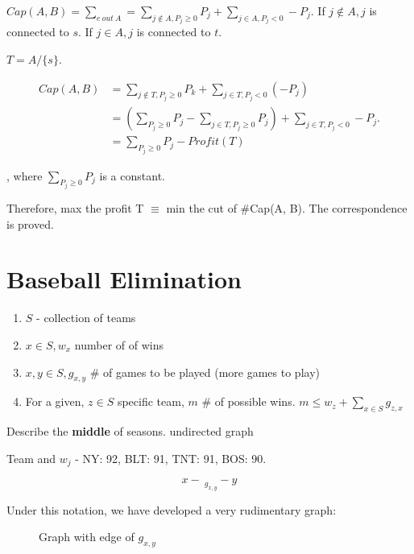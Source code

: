 \documentclass[a4paper]{report}
\theoremstyle{definition}
\begin{document}
$Cap(A, B)=\sum_{e~out~A} = \sum_{j \notin A, P_j\geq 0}P_j+\sum_{j \in A, P_j<0}-P_j$. If $j \notin A, j$ is connected to $s$. If $j \in A, j$ is connected to $t$. 

$T=A/\{s\}$.

\begin{align*}
Cap(A, B)&=\sum_{j\notin T, P_j\geq 0}P_k+\sum_{j\in T, P_j <0}(-P_j) \\
&= (\sum_{P_j\geq 0}P_j-\sum_{j \in T, P_j\geq 0}P_j)+\sum_{j\in T, P_j <0}-P_j.\\
&=  \sum_{P_j\geq 0}P_j - Profit(T)
\end{align*}

, where $\sum_{P_j\geq 0}P_j$ is a constant.

Therefore, max the profit T $\equiv$ min the cut of #Cap(A, B). The correspondence is proved. 


\section{Baseball Elimination}
\begin{enumerate}
\item $S$ - collection of teams 
\item $x\in S, w_x$ number of of wins
\item $x, y \in S, g_{x, y}$  \# of games to be played (more games to play)
\item For a given, $z\in S$ specific team, $m$ \# of possible wins. $m \leq w_z+\sum_{x\in S} g_{z,x}$
\end{enumerate}

Describe the \textbf{middle} of seasons. undirected graph

Team and $w_j$ - NY: 92, BLT: 91, TNT: 91, BOS: 90.

$$x -\ _{g_{x, y}} - y$$


Under this notation, we have developed a very rudimentary graph: 
\begin{figure}[!htp]
\centering
{}
\caption{Graph with edge of $g_{x,y}$}
\label{fig:baseball0}
\end{figure}
\end{document}

